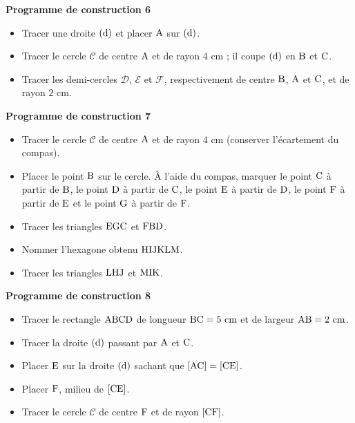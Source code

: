 \documentclass{article}
\begin{document}
\noindent\textbf{Programme de construction 6}\par\smallskip\noindent
\begin{itemize}
    \item Tracer une droite $(\text{d})$ et placer
    $\text{A}$ sur $(\text{d})$.
    \item Tracer le cercle $\mathcal{C}$ de centre $\text{A}$ et de
    rayon $4\text{ cm}$ ; il coupe $(\text{d})$ en
    $\text{B}$ et $\text{C}$.
    \item Tracer les demi-cercles $\mathcal{D}$, $\mathcal{E}$ et
    $\mathcal{F}$, respectivement de centre $\text{B}$,
    $\text{A}$ et $\text{C}$, et de rayon $2\text{ cm}$.
\end{itemize}
\noindent\textbf{Programme de construction 7}\par\smallskip\noindent
\begin{itemize}
    \item Tracer le cercle $\mathcal{C}$ de centre $\text{A}$ et de
    rayon $4\text{ cm}$ (conserver l'écartement du compas).
    \item Placer le point $\text{B}$ sur le cercle. À l'aide du
    compas, marquer le point $\text{C}$ à partir de
    $\text{B}$, le point $\text{D}$ à partir de
    $\text{C}$, le point $\text{E}$ à partir de
    $\text{D}$, le point $\text{F}$ à partir de
    $\text{E}$ et le point $\text{G}$ à partir de
    $\text{F}$.
    \item Tracer les triangles $\text{EGC}$ et $\text{FBD}$.
    \item Nommer l'hexagone obtenu $\text{HIJKLM}$.
    \item Tracer les triangles $\text{LHJ}$ et $\text{MIK}$.
\end{itemize}
\noindent\textbf{Programme de construction 8}\par\smallskip\noindent
\begin{itemize}
    \item Tracer le rectangle $\text{ABCD}$ de longueur
    $\text{BC}=5\text{ cm}$ et de largeur $\text{AB}=2\text{ cm}$.
    \item Tracer la droite $(\text{d})$ passant par
    $\text{A}$ et $\text{C}$.
    \item Placer $\text{E}$ sur la droite $(\text{d})$ sachant
    que $[\text{AC}]=[\text{CE}]$.
    \item Placer $\text{F}$, milieu de $[\text{CE}]$.
    \item Tracer le cercle $\mathcal{C}$ de centre $\text{F}$ et de
    rayon $[\text{CF}]$.
\end{itemize}
\end{document}
